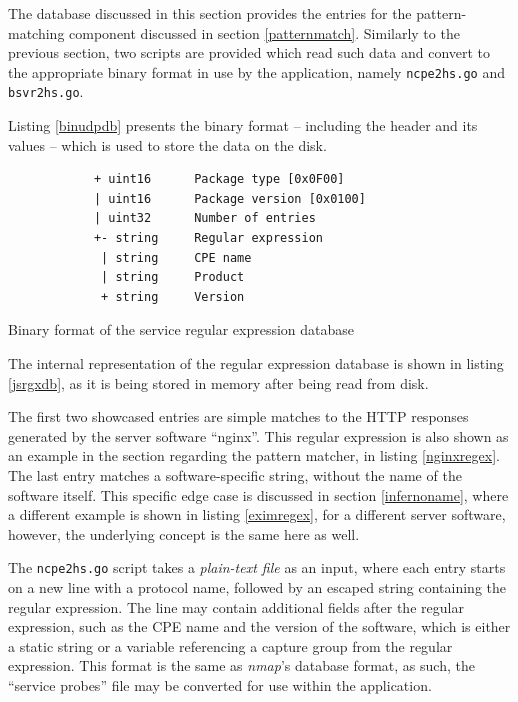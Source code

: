 \documentclass[a4paper,12pt]{article}
\begin{document}
	The database discussed in this section provides the entries for the pattern-matching component discussed in section \ref{patternmatch}. Similarly to the previous section, two scripts are provided which read such data and convert to the appropriate binary format in use by the application, namely \texttt{ncpe2hs.go} and \texttt{bsvr2hs.go}.
	
	Listing \ref{binudpdb} presents the binary format -- including the header and its values -- which is used to store the data on the disk.
	
	\begin{listing}[H]
		\begin{verbatim}
			+ uint16      Package type [0x0F00]
			| uint16      Package version [0x0100]
			| uint32      Number of entries
			+- string     Regular expression
			 | string     CPE name
			 | string     Product
			 + string     Version
		\end{verbatim}
		\caption{Binary format of the service regular expression database}
		\label{binrgxdb}
	\end{listing}
	
	The internal representation of the regular expression database is shown in listing \ref{jsrgxdb}, as it is being stored in memory after being read from disk.
	
	The first two showcased entries are simple matches to the HTTP responses generated by the server software ``nginx''. This regular expression is also shown as an example in the section regarding the pattern matcher, in listing \ref{nginxregex}. The last entry matches a software-specific string, without the name of the software itself. This specific edge case is discussed in section \ref{infernoname}, where a different example is shown in listing \ref{eximregex}, for a different server software, however, the underlying concept is the same here as well.
	
	The \texttt{ncpe2hs.go} script takes a \textit{plain-text file} as an input, where each entry starts on a new line with a protocol name, followed by an escaped string containing the regular expression. The line may contain additional fields after the regular expression, such as the CPE name and the version of the software, which is either a static string or a variable referencing a capture group from the regular expression. This format is the same as \textit{nmap}'s database format, as such, the ``service probes'' file may be converted for use within the application.
	
\end{document}
